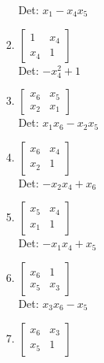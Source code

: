 \documentclass[12pt]{article}
\begin{document}
\begin{enumerate}
\begin{enumerate}
\begin{enumerate}
Det: $x_{1} - x_{4} x_{5}$\\


\item $\displaystyle \left[\begin{matrix}1 & x_{4}\\x_{4} & 1\end{matrix}\right]$\\

Det: $- x_{4}^{2} + 1$\\


\item $\displaystyle \left[\begin{matrix}x_{6} & x_{5}\\x_{2} & x_{1}\end{matrix}\right]$\\

Det: $x_{1} x_{6} - x_{2} x_{5}$\\


\item $\displaystyle \left[\begin{matrix}x_{6} & x_{4}\\x_{2} & 1\end{matrix}\right]$\\

Det: $- x_{2} x_{4} + x_{6}$\\


\item $\displaystyle \left[\begin{matrix}x_{5} & x_{4}\\x_{1} & 1\end{matrix}\right]$\\

Det: $- x_{1} x_{4} + x_{5}$\\


\item $\displaystyle \left[\begin{matrix}x_{6} & 1\\x_{5} & x_{3}\end{matrix}\right]$\\

Det: $x_{3} x_{6} - x_{5}$\\


\item $\displaystyle \left[\begin{matrix}x_{6} & x_{3}\\x_{5} & 1\end{matrix}\right]$\\


\end{enumerate}
\end{enumerate}
\end{enumerate}
\end{document}
